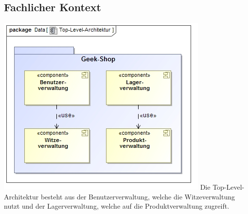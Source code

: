 \documentclass[pdftex,12pt,a4paper]{article}
\begin{document}
\subsection{Fachlicher Kontext}
\includegraphics[width=\textwidth]{../Pflichtenheft/images/toplevelarchitektur}
Die Top-Level-Architektur besteht aus der Benutzerverwaltung, welche die Witzeverwaltung nutzt und der Lagerverwaltung, welche auf die Produktverwaltung zugreift.

\end{document}
